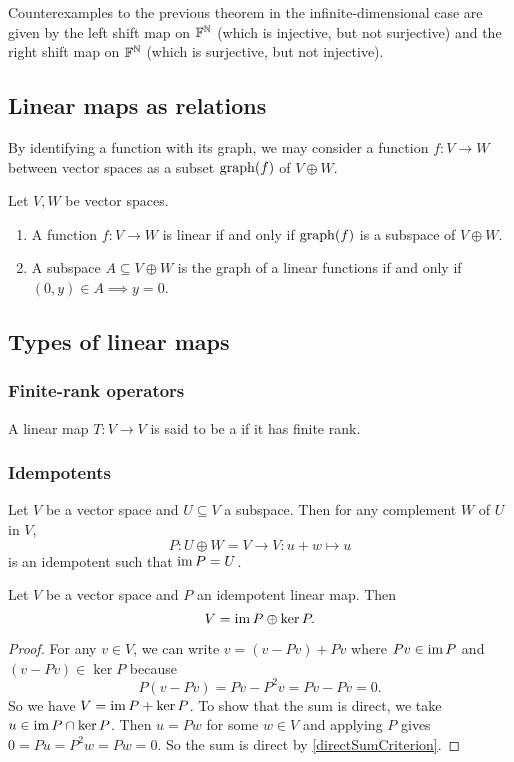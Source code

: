 \begin{example}
Counterexamples to the previous theorem in the infinite-dimensional case are given by the left shift map on $\mathbb{F}^{\mathbb{N}}$ (which is injective, but not surjective) and the right shift map on $\mathbb{F}^{\mathbb{N}}$ (which is surjective, but not injective).
\end{example}

\subsection{Linear maps as relations}
By identifying a function with its graph, we may consider a function $f: V\to W$ between vector spaces as a subset $\operatorname{graph}(f)$ of $V\oplus W$.

\begin{proposition}
Let $V,W$ be vector spaces.
\begin{enumerate}
\item A function $f: V\to W$ is linear \textup{if and only if} $\operatorname{graph}(f)$ is a subspace of $V\oplus W$.
\item A subspace $A\subseteq V\oplus W$ is the graph of a linear functions \textup{if and only if} $(0,y)\in A \implies y=0$.
\end{enumerate}
\end{proposition}

\subsection{Types of linear maps}
\subsubsection{Finite-rank operators}
\begin{definition}
A linear map $T: V\to V$ is said to be a  if it has finite rank.
\end{definition}
\subsubsection{Idempotents}

\begin{lemma}
Let $V$ be a vector space and $U\subseteq V$ a subspace. Then for any complement $W$ of $U$ in $V$,
\[ P: U\oplus W = V \to V: u+w \mapsto u \]
is an idempotent such that $\operatorname{im} P = U$.
\end{lemma}

\begin{proposition} \label{directSumKernelImageIdempotent}
Let $V$ be a vector space and $P$ an idempotent linear map. Then
\[ V = \operatorname{im} P \oplus \ker P. \]
\end{proposition}
\begin{proof}
For any $v\in V$, we can write $v= (v-Pv)+Pv$ where $Pv\in \operatorname{im} P$ and $(v-Pv)\in \ker P$ because
\[ P(v-Pv) = Pv- P^2v = Pv - Pv = 0. \]
So we have $V = \operatorname{im} P + \ker P$. To show that the sum is direct, we take $u\in \operatorname{im} P \cap \ker P$. Then $u = Pw$ for some $w\in V$ and applying $P$ gives $0 = Pu = P^2w = Pw = 0$. So the sum is direct by \ref{directSumCriterion}.
\end{proof}

